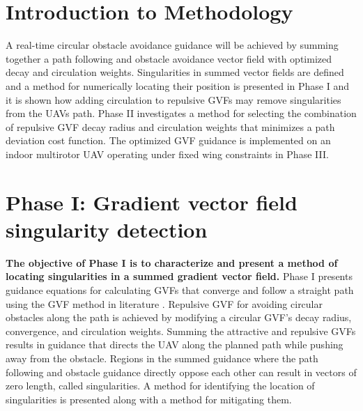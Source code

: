 \documentclass[numbered,pdftex]{ohio-etd}
\begin{document}
%



\section{Introduction to Methodology}
A real-time circular obstacle avoidance guidance will be achieved by summing together a path following and obstacle avoidance vector field with optimized decay and circulation weights. Singularities in summed vector fields are defined and a method for numerically locating their position is presented in Phase I and it is shown how adding circulation to repulsive GVFs may remove singularities from the UAVs path. Phase II investigates a method for selecting the combination of repulsive GVF decay radius and circulation weights that minimizes a path deviation cost function. The optimized GVF guidance is implemented on an indoor multirotor UAV operating under fixed wing constraints in Phase III.


\section{Phase I: Gradient vector field singularity detection}
 \textbf{The objective of Phase I is to characterize and present a method of locating singularities in a summed gradient vector field.} Phase I presents guidance equations for calculating GVFs that converge and follow a straight path using the GVF method in literature \cite{goncalves_artificial_2009,goncalves_circulation_2010,goncalves_vector_2010}. Repulsive GVF for avoiding circular obstacles along the path is achieved by modifying a circular GVF's decay radius, convergence, and circulation weights. Summing the attractive and repulsive GVFs results in guidance that directs the UAV along the planned path while pushing away from the obstacle. Regions in the summed guidance where the path following and obstacle guidance directly oppose each other can result in vectors of zero length, called singularities. A method for identifying the location of singularities is presented along with a method for mitigating them. 
 
\end{document}
